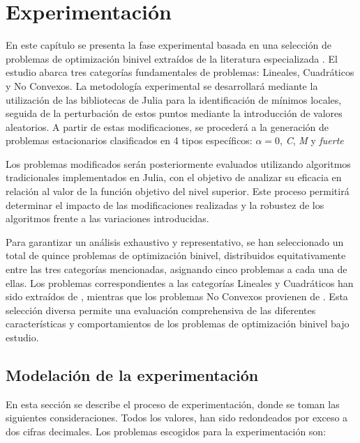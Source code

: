 
\chapter{Experimentación}


En este capítulo se presenta la fase experimental basada en una selección de problemas de optimización binivel extraídos de la literatura especializada \cite{BolibTestProblems}. El estudio abarca tres categorías fundamentales de problemas: Lineales, Cuadráticos y No Convexos. La metodología experimental se desarrollará mediante la utilización de las bibliotecas de Julia para la identificación de mínimos locales, seguida de la perturbación de estos puntos mediante la introducción de valores aleatorios. A partir de estas modificaciones, se procederá a la generación de problemas estacionarios clasificados en 4 tipos específicos: $\alpha = 0$, \textit{C}, \textit{M} y \textit{fuerte}

Los problemas modificados serán posteriormente evaluados utilizando algoritmos tradicionales implementados en Julia, con el objetivo de analizar su eficacia en relación al valor de la función objetivo del nivel superior. Este proceso permitirá determinar el impacto de las modificaciones realizadas y la robustez de los algoritmos frente a las variaciones introducidas.

Para garantizar un análisis exhaustivo y representativo, se han seleccionado un total de quince problemas de optimización binivel, distribuidos equitativamente entre las tres categorías mencionadas, asignando cinco problemas a cada una de ellas. Los problemas correspondientes a las categorías Lineales y Cuadráticos han sido extraídos de \cite{Floudas1999HandbookOT}, mientras que los problemas No Convexos provienen de \cite{BolibTestProblems}. Esta selección diversa permite una evaluación comprehensiva de las diferentes características y comportamientos de los problemas de optimización binivel bajo estudio.



\section{Modelación de la experimentación}
En esta sección se describe el proceso de experimentación, donde se toman las siguientes consideraciones. 
Todos los valores, han sido redondeados por exceso a dos cifras decimales. 
Los problemas escogidos para la experimentación son:

